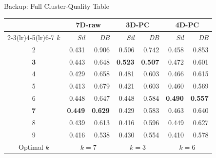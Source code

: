 \documentclass[10pt,aspectratio=169]{beamer}
\newcommand{\pc}[1]{PC#1}
\newcommand{\sil}{\textit{Sil}}
\newcommand{\db}{\textit{DB}}
\begin{document}
\begin{frame}{Backup: Full Cluster-Quality Table}
  \begin{center}
  \setlength{\tabcolsep}{9pt}
  \begin{tabular}{@{}c rr rr rr@{}}
  \toprule
   & \multicolumn{2}{c}{\textbf{7D-raw}} &
     \multicolumn{2}{c}{\textbf{3D-\pc{}}} &
     \multicolumn{2}{c}{\textbf{4D-\pc{}}} \\
  \cmidrule(lr){2-3}\cmidrule(lr){4-5}\cmidrule(lr){6-7}
  $k$ & \sil{} & \db{} & \sil{} & \db{} & \sil{} & \db{} \\
  \midrule
  2 & 0.431 & 0.906 & 0.506 & 0.742 & 0.458 & 0.853 \\
  \textbf{3} & 0.443 & 0.648 & \textbf{0.523} & \textbf{0.507} & 0.472 & 0.601 \\
  4 & 0.429 & 0.658 & 0.481 & 0.603 & 0.466 & 0.615 \\
  5 & 0.413 & 0.679 & 0.421 & 0.603 & 0.460 & 0.569 \\
  6 & 0.448 & 0.647 & 0.448 & 0.584 & \textbf{0.490} & \textbf{0.557} \\
  \textbf{7} & \textbf{0.449} & \textbf{0.629} & 0.429 & 0.583 & 0.463 & 0.640 \\
  8 & 0.439 & 0.613 & 0.416 & 0.596 & 0.449 & 0.627 \\
  9 & 0.416 & 0.538 & 0.430 & 0.554 & 0.410 & 0.578 \\
  \midrule
  Optimal $k$ & \multicolumn{2}{c}{$k=7$} & \multicolumn{2}{c}{$k=3$} &
    \multicolumn{2}{c}{$k=6$} \\
  \bottomrule
  \end{tabular}
  \end{center} 
\end{frame}
\end{document}
